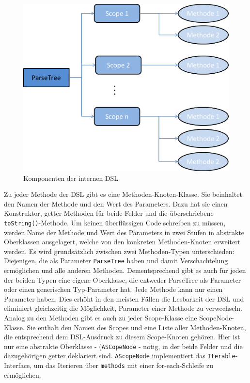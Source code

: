 \begin{figure}[H]
\centering\includegraphics[width=.8\textwidth]{images/kapitel4/parseTree.png}
\caption{Komponenten der internen DSL}
\label{fig:parse-tree}
\end{figure}

Zu jeder Methode der DSL gibt es eine Methoden-Knoten-Klasse. Sie beinhaltet den Namen der Methode und den Wert des Parameters. Dazu hat sie einen Konstruktor, getter-Methoden für beide Felder und die überschriebene \texttt{toString()}-Methode. Um keinen überflüssigen Code schreiben zu müssen, werden Name der Methode und Wert des Parameters in zwei Stufen in abstrakte Oberklassen ausgelagert, welche von den konkreten Methoden-Knoten erweitert werden. Es wird grundsätzlich zwischen zwei Methoden-Typen unterschieden: Diejenigen, die als Parameter \texttt{ParseTree} haben und damit Verschachtelung ermöglichen und alle anderen Methoden. Dementsprechend gibt es auch für jeden der beiden Typen eine eigene Oberklasse, die entweder ParseTree als Parameter oder einen generischen Typ-Parameter hat. Jede Methode kann nur einen Parameter haben. Dies erhöht in den meisten Fällen die Lesbarkeit der DSL und eliminiert gleichzeitig die Möglichkeit, Parameter einer Methode zu verwechseln. \\
Analog zu den Methoden gibt es auch zu jeder Scope-Klasse eine ScopeNode-Klasse. Sie enthält den Namen des Scopes und eine Liste aller Methoden-Knoten, die entsprechend dem DSL-Ausdruck zu diesem Scope-Knoten gehören. Hier ist nur eine abstrakte Oberklasse - (\texttt{ASCopeNode} -  nötig, in der beide Felder und die dazugehörigen getter deklariert sind. \texttt{AScopeNode} implementiert das \texttt{Iterable}-Interface, um das Iterieren über \texttt{methods} mit einer for-each-Schleife zu ermöglichen.

